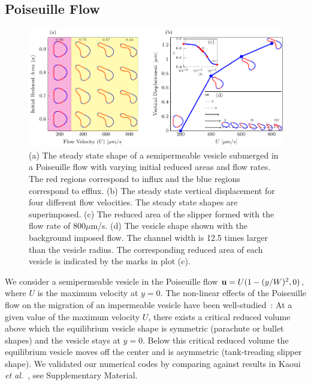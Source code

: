 \documentclass[9pt,twocolumn,twoside,lineno]{pnas-new}
\newif\ifTikz
\begin{document}
\subsection*{Poiseuille Flow}
\begin{figure}[htp]
  \centering
  \ifTikz
  
  \else
  \includegraphics{figures/parabolicComposite.pdf}
  \fi
  \caption{\label{fig:parabolicComposite} (a) The steady state shape of
  a semipermeable vesicle submerged in a Poiseuille flow with varying
  initial reduced areas and flow rates. The red regions correspond to
  influx and the blue regions correspond to efflux. (b) The steady
  state vertical displacement for four different flow velocities. The
  steady state shapes are superimposed. (c) The reduced area of the
  slipper formed with the flow rate of $800 \mu$m/s. (d) The vesicle
  shape shown with the background imposed flow. The channel width is
  12.5 times larger than the vesicle radius. The corresponding reduced
  area of each vesicle is indicated by the marks in plot (c).}
\end{figure}


We consider a semipermeable vesicle in the Poiseuille flow $\mathbf{u} =
U(1-(y/W)^2,0)$, where $U$ is the maximum velocity at $y=0$. The
non-linear effects of the Poiseuille flow on the migration of an
impermeable vesicle have been well-studied~\cite{kao-bir-mis2009}: At a
given value of the maximum velocity $U$, there exists a critical reduced
volume above which the equilibrium vesicle shape is symmetric (parachute
or bullet shapes) and the vesicle stays at $y=0$. Below this critical
reduced volume the equilibrium vesicle moves off the center and is
asymmetric (tank-treading slipper shape). We validated our numerical
codes by comparing against results in Kaoui {\em et
al.}~\cite{kao-bir-mis2009}, see Supplementary Material.
\end{document}
